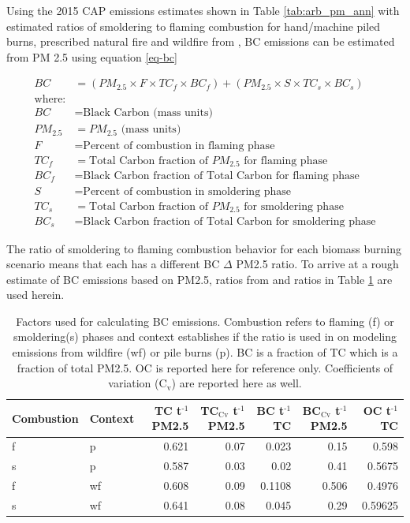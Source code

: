 \documentclass[a4paper,titlepage]{article}
\begin{document}
Using the 2015 \ac{CAP} emissions estimates shown in Table \ref{tab:arb_pm_ann} with estimated ratios of smoldering to flaming combustion for hand/machine piled burns, prescribed natural fire and wildfire from \citet{Ward1989}, \ac{BC} emissions can be estimated from PM 2.5 using equation \eqref{eq-bc}


\begin{align}
BC &= \left( PM_{2.5} \times F \times TC_f \times BC_f\right) + \left( PM_{2.5} \times S \times TC_s \times BC_s\right) \label{eq-bc} \\
\text{where:} \nonumber \\
BC &= \text{Black Carbon (mass units)} \nonumber \\
PM_{2.5} &= PM_{2.5} \text{ (mass units)} \nonumber \\
F &= \text{Percent of combustion in flaming phase} \nonumber \\
TC_f &= \text{Total Carbon fraction of } PM_{2.5} \text{ for flaming phase} \nonumber \\
BC_f &= \text{Black Carbon fraction of Total Carbon for flaming phase} \nonumber \\
S &= \text{Percent of combustion in smoldering phase} \nonumber \\
TC_s &= \text{Total Carbon fraction of } PM_{2.5} \text{ for smoldering phase} \nonumber \\
BC_s &= \text{Black Carbon fraction of Total Carbon for smoldering phase} \nonumber
\end{align}

The ratio of smoldering to flaming combustion behavior for each biomass burning scenario means that each has a different \ac{BC} \(\Delta\) \ac{PM2.5}
ratio. To arrive at a rough estimate of \ac{BC} emissions based on PM2.5, ratios from  \citet{Ward1989} and \citet{Jenk1996} ratios in Table \ref{tab:bc_pm} are used herein.
\begin{table}[htb]
\centering
\begin{tabular}{llrrrrr}
Combustion & Context & TC t\(^{\text{-1}}\) \ac{PM2.5} & TC\(_{\text{Cv}}\) t\(^{\text{-1}}\) \ac{PM2.5} & BC t\(^{\text{-1}}\) TC & BC\(_{\text{Cv}}\) t\(^{\text{-1}}\) \ac{PM2.5} & OC t\(^{\text{-1}}\) TC\\
\hline
f & p & 0.621 & 0.07 & 0.023 & 0.15 & 0.598\\
s & p & 0.587 & 0.03 & 0.02 & 0.41 & 0.5675\\
f & wf & 0.608 & 0.09 & 0.1108 & 0.506 & 0.4976\\
s & wf & 0.641 & 0.08 & 0.045 & 0.29 & 0.59625\\
\end{tabular}
\caption{Factors used for calculating \ac{BC} emissions. Combustion refers to flaming (f) or smoldering(s) phases and context establishes if the ratio is used in on modeling emissions from wildfire (wf) or pile burns (p). \ac{BC} is a fraction of \ac{TC} which is a fraction of total \ac{PM2.5}. \ac{OC} is reported here for reference only. Coefficients of variation (C\(_{\text{v}}\)) are reported here as well. \label{tab:bc_pm}}

\end{table}
\end{document}
